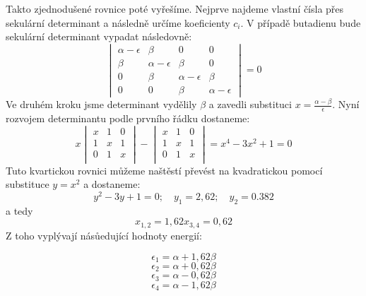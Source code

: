Takto zjednodušené rovnice poté vyřešíme. Nejprve najdeme vlastní čísla přes sekulární determinant a následně určíme koeficienty $c_i$. V případě butadienu bude sekulární determinant vypadat následovně:
\begin{equation}
\begin{vmatrix}
\alpha-\epsilon & \beta & 0 & 0  \\
\beta &\alpha-\epsilon & \beta & 0  \\
0 &\beta &\alpha-\epsilon & \beta  \\
0 & 0 & \beta &\alpha-\epsilon  
\end{vmatrix}
= 0
\end{equation}
Ve druhém kroku jsme determinant vydělily $\beta$ a zavedli substituci $x=\frac{\alpha-\beta}{\epsilon}$.
Nyní rozvojem determinantu podle prvního řádku dostaneme:
\begin{equation}
x
\begin{vmatrix}
x & 1 & 0 \\
1 & x & 1 \\
0 & 1 & x \\
\end{vmatrix}
-
\begin{vmatrix}
x & 1 & 0 \\
1 & x & 1 \\
0 & 1 & x \\
\end{vmatrix}
=x^4-3x^2+1=0
\end{equation}
Tuto kvartickou rovnici můžeme naštěstí převést na kvadratickou pomocí substituce $y=x^2$ a dostaneme:
\begin{equation}
y^2-3y+1=0;\quad y_1=2,62;\quad y_2=0.382
\end{equation}
a tedy
\begin{equation}
x_{1,2}=1,62 \nonumber
x_{3,4}=0,62 \nonumber
\end{equation}
Z toho vyplývají násůedující hodnoty energií:

$$ \epsilon_1 = \alpha+1,62\beta $$
$$ \epsilon_2 = \alpha+0,62\beta $$
$$ \epsilon_3 = \alpha-0,62\beta $$
$$ \epsilon_4 = \alpha-1,62\beta $$

